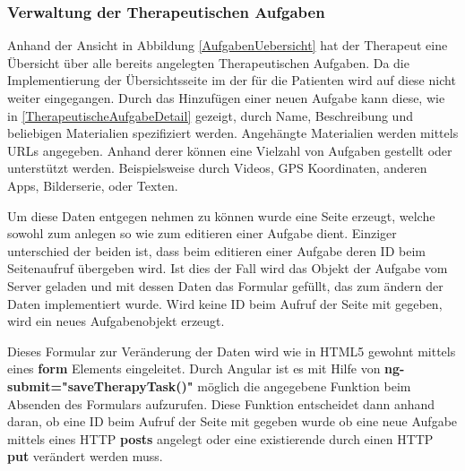 \subsubsection{Verwaltung der Therapeutischen Aufgaben}

Anhand der Ansicht in Abbildung \ref{AufgabenUebersicht} hat der Therapeut eine Übersicht über alle bereits angelegten Therapeutischen Aufgaben. Da die Implementierung der Übersichtsseite im der für die Patienten wird auf diese nicht weiter eingegangen. Durch das Hinzufügen einer neuen Aufgabe kann diese, wie in \ref{TherapeutischeAufgabeDetail} gezeigt, durch Name, Beschreibung und beliebigen Materialien spezifiziert werden. Angehängte Materialien werden mittels URLs angegeben. Anhand derer können eine Vielzahl von Aufgaben gestellt oder unterstützt werden. Beispielsweise durch Videos, GPS Koordinaten, anderen Apps, Bilderserie, oder Texten.

Um diese Daten entgegen nehmen zu können wurde eine Seite erzeugt, welche sowohl zum anlegen so wie zum editieren einer Aufgabe dient. Einziger unterschied der beiden ist, dass beim editieren einer Aufgabe deren ID beim Seitenaufruf übergeben wird. Ist dies der Fall wird das Objekt der Aufgabe vom Server geladen und mit dessen Daten das Formular gefüllt, das zum ändern der Daten implementiert wurde. Wird keine ID beim Aufruf der Seite mit gegeben, wird ein neues Aufgabenobjekt erzeugt.

Dieses Formular zur Veränderung der Daten wird wie in HTML5 gewohnt mittels eines \textbf{form} Elements eingeleitet. Durch Angular ist es mit Hilfe von \textbf{ng-submit="saveTherapyTask()"} möglich die angegebene Funktion beim Absenden des Formulars aufzurufen. Diese Funktion entscheidet dann anhand daran, ob eine ID beim Aufruf der Seite mit gegeben wurde ob eine neue Aufgabe mittels eines HTTP \textbf{posts} angelegt oder eine existierende durch einen HTTP \textbf{put} verändert werden muss.

